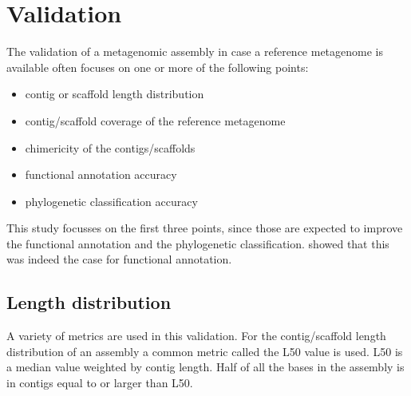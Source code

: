 \documentclass[a4paper,12pt]{report}
\begin{document}

\clearpage \section{Validation} \label{sec:metval} The validation of a metagenomic assembly in
case a reference metagenome is available often focuses on one or more of the
following points:
\begin{itemize}
\item contig or scaffold length distribution
\item contig/scaffold coverage of the reference metagenome
\item chimericity of the contigs/scaffolds
\item functional annotation accuracy
\item phylogenetic classification accuracy
\end{itemize}
This study focusses on the first three points, since those are expected to
improve the functional annotation and the phylogenetic classification.
\citet{Mende22384016} showed that this was indeed the case for functional
annotation.\\


\subsection{Length distribution}
A variety of metrics are used in this validation. For the contig/scaffold
length distribution of an assembly a common metric called the L50 value is
used. L50 is a median value weighted by contig length. Half of all the bases in
the assembly is in contigs equal to or larger than L50.
\end{document}
